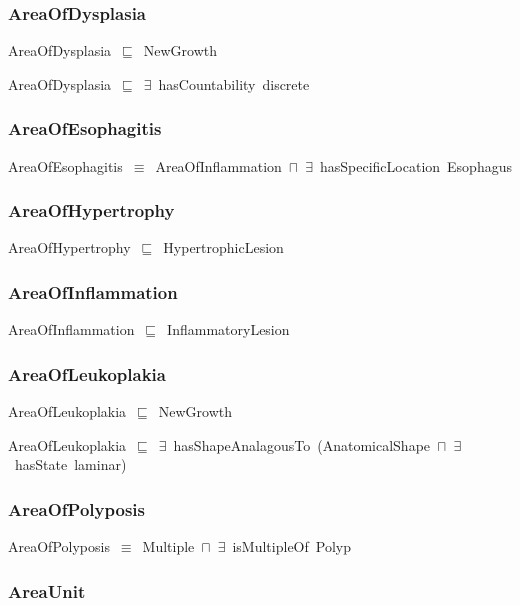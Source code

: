 \documentclass{article}
\begin{document}
\subsubsection*{AreaOfDysplasia}

AreaOfDysplasia~\ensuremath{\sqsubseteq}~NewGrowth~

AreaOfDysplasia~\ensuremath{\sqsubseteq}~\ensuremath{\exists}~hasCountability~discrete~

\subsubsection*{AreaOfEsophagitis}

AreaOfEsophagitis~\ensuremath{\equiv}~AreaOfInflammation~\ensuremath{\sqcap}~\ensuremath{\exists}~hasSpecificLocation~Esophagus

\subsubsection*{AreaOfHypertrophy}

AreaOfHypertrophy~\ensuremath{\sqsubseteq}~HypertrophicLesion~

\subsubsection*{AreaOfInflammation}

AreaOfInflammation~\ensuremath{\sqsubseteq}~InflammatoryLesion~

\subsubsection*{AreaOfLeukoplakia}

AreaOfLeukoplakia~\ensuremath{\sqsubseteq}~NewGrowth~

AreaOfLeukoplakia~\ensuremath{\sqsubseteq}~\ensuremath{\exists}~hasShapeAnalagousTo~(AnatomicalShape~\ensuremath{\sqcap}~\ensuremath{\exists}~hasState~laminar)~

\subsubsection*{AreaOfPolyposis}

AreaOfPolyposis~\ensuremath{\equiv}~Multiple~\ensuremath{\sqcap}~\ensuremath{\exists}~isMultipleOf~Polyp

\subsubsection*{AreaUnit}
\end{document}
